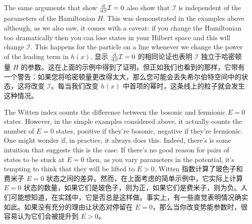 \documentclass{article}
\begin{document}
The same arguments that show $\odv*{\mathcal{I}}{\beta} = 0$ also show that $\mathcal{I}$ is independent of the parameters of the Hamiltonian $H$. This was demonstrated in the examples above although, as we also saw, it comes with a caveat: if you change the Hamiltonian too dramatically then you can lose states in your Hilbert space and this will change $\mathcal{I}$. This happens for the particle on a line whenever we change the power of the leading term in $h(x)$.
显示 $\odv*{\mathcal{I}}{\beta} = 0$ 的相同论证也表明 $\mathcal{I}$ 独立于哈密顿量 $H$ 的参数。这在上面的示例中得到了证明，但正如我们也看到的那样，它带有一个警告：如果您将哈密顿量更改得太大，那么您可能会丢失希尔伯特空间中的状态，这将改变 $\mathcal{I}$。每当我们改变 $h(x)$ 中首项的幂时，这条线上的粒子就会发生这种情况。

The Witten index counts the difference between the bosonic and fermionic $E = 0$ states. However, in the simple examples considered above, it actually counts the number of $E = 0$ states, positive if they're bosonic, negative if they're fermionic. One might wonder if, in practice, it always does this. Indeed, there's is some intuition that suggests this is the case. If there's no good reason for pairs of states to be stuck at $E = 0$ then, as you vary parameters in the potential, it's tempting to think that they will be lifted to $E > 0$.
Witten 指数计算了玻色子和费米子 $E = 0$ 状态之间的差异。然而，在上面考虑的简单示例中，它实际上计算 $E = 0$ 状态的数量，如果它们是玻色子，则为正，如果它们是费米子，则为负。人们可能想知道，在实践中，它是否总是这样做。事实上，有一些直觉表明情况确实如此。如果没有充分的理由让状态对停留在 $E = 0$，那么当你改变势能参数时，很容易认为它们会被提升到 $E > 0$。
\end{document}
